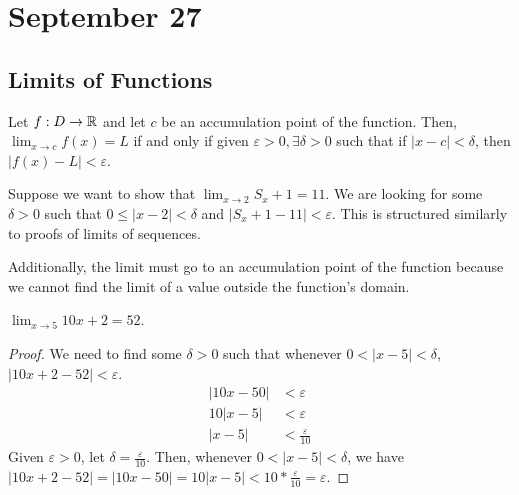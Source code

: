 \section{September 27}

\subsection{Limits of Functions}
\begin{definition}
    Let $f:D \to \mathbb{R}$ and let $c$ be an accumulation point of the function. Then, $\lim_{x \to c} f(x) = L$ if and only if given $\varepsilon > 0, \exists \delta > 0$ such that if $|x - c| < \delta$, then $|f(x) - L| < \varepsilon$.
\end{definition}
\begin{remark}
    Suppose we want to show that $\lim_{x \to 2} S_x + 1 = 11$. We are looking for some $\delta > 0$ such that $0 \leq |x  - 2| < \delta$ and $|S_x + 1 - 11| < \varepsilon$. This is structured similarly to proofs of limits of sequences.

    Additionally, the limit must go to an accumulation point of the function because we cannot find the limit of a value outside the function's domain.
\end{remark}

\begin{theorem}
    $\lim_{x \to 5} 10x + 2 = 52$.
\end{theorem}
\begin{proof}
    We need to find some $\delta > 0$ such that whenever $0 < |x - 5| < \delta$, $|10x + 2 - 52| < \varepsilon$.
    \begin{align*}
        |10x - 50| &< \varepsilon \\
        10|x - 5| &< \varepsilon \\
        |x - 5| &< \frac{\varepsilon}{10}
    \end{align*}
    Given $\varepsilon > 0$, let $\delta = \frac{\varepsilon}{10}$. Then, whenever $0 < |x - 5| < \delta$, we have $|10x + 2 - 52| = |10x - 50| = 10|x - 5| < 10 * \frac{\varepsilon}{10} = \varepsilon$.
\end{proof}

